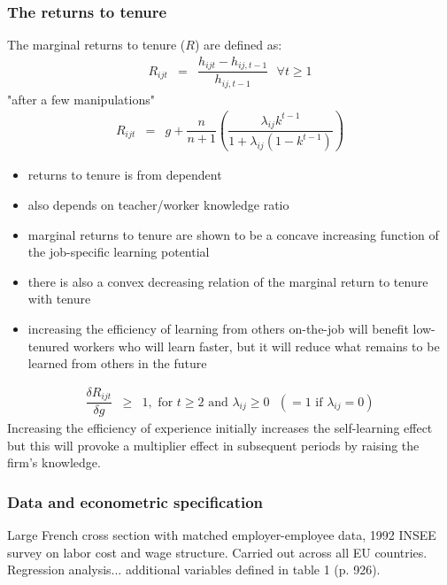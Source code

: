 \documentclass[12pt,a4paper]{article}
\begin{document}
  \subsubsection{The returns to tenure} %
  \label{ssub:The returns to tenure}
  The marginal returns to tenure ($R$) are defined as:
  \begin{eqnarray*}
    R_{ijt} &=& \dfrac{h_{ijt}- h_{ij,t-1}}{h_{ij,t-1}} \mbox{  } \forall t \geq 1
  \end{eqnarray*}
  "after a few manipulations"
  \begin{eqnarray}
    R_{ijt} &=& g + \dfrac{n}{n+1} \left( \dfrac{\lambda_{ij} k^{t-1}}{1+\lambda_{ij}(1-k^{t-1})} \right)
  \end{eqnarray}
  \begin{itemize}
    \item returns to tenure is from dependent
    \item also depends on teacher/worker knowledge ratio
    \item marginal returns to tenure are shown to be a concave increasing function of the
      job-specific learning potential
    \item there is also a convex decreasing relation of the marginal return to tenure with tenure
    \item increasing the efficiency of learning from others on-the-job will benefit low-tenured
      workers who will learn faster, but it will reduce what remains to be learned from others in
      the future
  \end{itemize}
  \begin{eqnarray*}
    \dfrac{\delta R_{ijt}}{\delta g} & \geq & 1, \mbox{  for  } t \geq 2 \mbox{  and  }
    \lambda_{ij} \geq 0 \mbox{  } (=1 \mbox{  if  } \lambda_{ij}=0)
  \end{eqnarray*}
  Increasing the efficiency of experience initially increases the self-learning effect but this will
  provoke a multiplier effect in subsequent periods by raising the firm's knowledge.

  \subsubsection{Data and econometric specification} %
  \label{ssub:Data and econometric specification}
  Large French cross section with matched employer-employee data, 1992 INSEE survey on labor cost
  and wage structure. Carried out across all EU countries. Regression analysis... additional
  variables defined in table 1 (p. 926).
\end{document}
